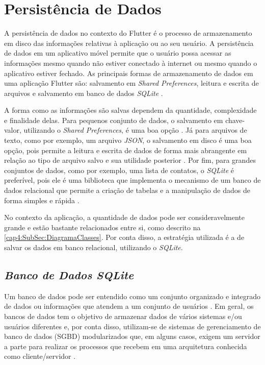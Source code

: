 


\section{Persistência de Dados}
\label{cap2:Sec:PersistenciaDados}
A persistência de dados no contexto do Flutter é o processo de armazenamento em disco das informações relativas à aplicação ou ao seu usuário.
A persistência de dados em um aplicativo móvel permite que o usuário possa acessar as informações mesmo quando não estiver conectado à internet ou mesmo quando o aplicativo estiver fechado. As principais formas de armazenamento de dados em uma aplicação Flutter são: salvamento em \textit{Shared Preferences}, leitura e escrita de arquivos e salvamento em banco de dados \textit{SQLite} \cite{persistence}.

A forma como as informações são salvas dependem da quantidade, complexidade e finalidade delas. Para pequenos conjunto de dados, o salvamento em chave-valor, utilizando o \textit{Shared Preferences}, é uma boa opção \cite{shared_preferences}. Já para arquivos de texto, como por exemplo, um arquivo \textit{JSON}, o salvamento em disco é uma boa opção, pois permite a leitura e escrita de dados de forma mais abrangente em relação ao tipo de arquivo salvo e sua utilidade posterior \cite{reading_writing_files}. Por fim, para grandes conjuntos de dados, como por exemplo, uma lista de contatos, o \textit{SQLite} é preferível, pois ele é uma biblioteca que implementa o mecanismo de um banco de dados relacional \cite{sqlite-org} que permite a criação de tabelas e a manipulação de dados de forma simples e rápida \cite{sqlite-flutter} \cite{sqlite_features}.

No contexto da aplicação, a quantidade de dados pode ser consideravelmente grande e estão bastante relacionados entre si, como descrito na \ref{cap4:SubSec:DiagramaClasses}. Por conta disso, a estratégia utilizada é a de salvar os dados em banco relacional, utilizando o \textit{SQLite}.

\subsection{\textit{Banco de Dados SQLite}}
\label{cap2:SubSec:BancoSQLite}
Um banco de dados pode ser entendido como um conjunto organizado e integrado de dados ou informações que atendem a um conjunto de usuários \cite{heuser09banco} \cite{oracle}. Em geral, os bancos de dados tem o objetivo de armazenar dados de vários sistemas e/ou usuários diferentes e, por conta disso, utilizam-se de sistemas de gerenciamento de banco de dados (SGBD) modularizados \cite{heuser09banco} que, em alguns casos, exigem um servidor a parte para realizar os processos que recebem em uma arquitetura conhecida como cliente/servidor \cite{sqlitetutorial_net}.

